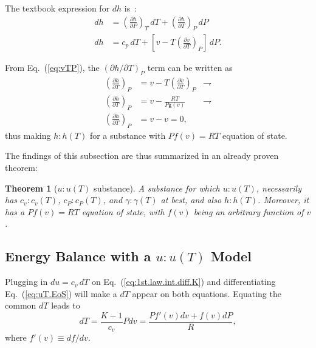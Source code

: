 \documentclass[fleqn,11pt]{SelfArx}
\newcommand{\parxyz}[3]{\left(\frac{\partial {{#1}}}{\partial {{#2}}}\right)_{\!\!\!{#3}}}
\newcommand{\inlxyz}[3]{({\partial {{#1}}}/{\partial {{#2}}})_{{#3}}}
\newtheorem{theorem}{Theorem}
\begin{document}
    The textbook expression for $dh$ is~\cite{2013-CengelYA+BolesMA-AMGH}:
    \begin{align}
        dh & = \parxyz hPT \,dT + \parxyz hTP \,dP \\
        dh & = c_p\,dT + \left[v - T\parxyz vTP \right]\,dP.
        \label{eq:dh}
    \end{align}

    From Eq.~(\ref{eq:vTP}), the $\inlxyz hTP$ term can be written as
    \begin{align}
        \parxyz hTP & = v - T\parxyz vTP & \rightharpoondown \\
        \parxyz hTP & = v - \frac{RT}{P\mathsf{g}(v)} & \rightharpoondown \\
        \parxyz hTP & = v - v = 0,
        \label{eq:hTP}
    \end{align}
    \noindent thus making $h\!:\!h(T)$ for a substance with $Pf(v) = RT$ equation of state.

    The findings of this subsection are thus summarized in an already proven theorem:

    \begin{theorem}[$u\!:\!u(T)$ substance]\label{theo:uT.subst}
        A substance for which $u\!:\!u(T)$, necessarily has $c_v\!:\!c_v(T)$,  $c_P\!:\!c_P(T)$,
        and $\gamma\!:\!\gamma(T)$ at best, and also $h\!:\!h(T)$. Moreover, it has a  $Pf(v)  =
        RT$ equation of state, with $f(v)$ being an arbitrary function of $v$.
    \end{theorem}

    \subsection{Energy Balance with a $u\!:\!u(T)$ Model}

    Plugging  in  $du  =  c_v\,dT$  on  Eq.~(\ref{eq:1st.law.int.diff.K})  and   differentiating
    Eq.~(\ref{eq:uT.EoS}) will make a $dT$ appear on both equations. Equating  the  common  $dT$
    leads to
    \begin{equation}
        dT = \frac{K-1}{c_v}Pdv = \frac{Pf'(v)dv + f(v)dP}{R},
        \label{eq:dT.1st.law.EoS}
    \end{equation}
    \noindent where $f'(v) \equiv df/dv$.
\end{document}
